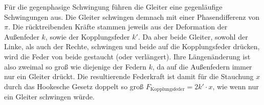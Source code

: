 \documentclass{article}
\begin{document}
                  Für die gegenphasige Schwingung führen die Gleiter eine gegenläufige Schwingungen aus.
                  Die Gleiter schwingen demnach mit einer Phasendifferenz von \( \pi \).
                  Die rücktreibenden Kräfte stammen jeweils aus der Deformation der Außenfeder \(k\), sowie der Kopplungsfeder \(k'\).
                  Da aber beide Gleiter, sowohl der Linke, als auch der Rechte, schwingen und beide auf die Kopplungsfeder drücken, wird die Feder von beide gestaucht (oder verlängert).
                  Ihre Längenänderung ist also zweimal so groß wie diejenige der Federn \(k\), da auf die Außenfedern immer nur ein Gleiter drückt.
                  Die resultierende Federkraft ist damit für die Stauchung \(x\) durch das Hookesche Gesetz doppelt so groß \( F_{\text{Kopplungsfeder}} = 2 k' \cdot x \), wie wenn nur ein Gleiter schwingen würde.
\end{document}
